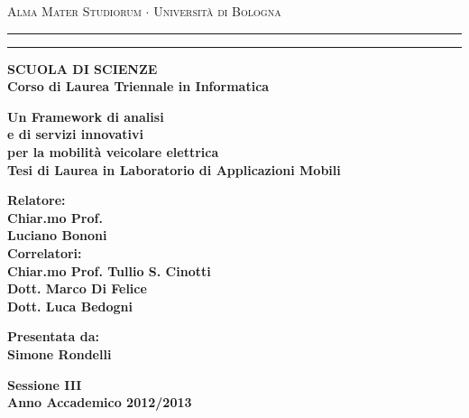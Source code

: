   \begin{titlepage}
    \begin{center}
      {{\Large{\textsc{Alma Mater Studiorum $\cdot$ Universit\`a di Bologna}}}} \rule[0.1cm]{15.8cm}{0.1mm}
      \rule[0.5cm]{15.8cm}{0.6mm}
      {\small{\bf SCUOLA DI SCIENZE\\
      Corso di Laurea Triennale in Informatica }}
    \end{center}
    
    \vspace{15mm}
    
    \begin{center}
      {\LARGE{\bf Un Framework di analisi}}\\
      \vspace{3mm}
      {\LARGE{\bf e di servizi innovativi}}\\
	  \vspace{3mm}
      {\LARGE{\bf per la mobilità veicolare elettrica}}\\
      \vspace{15mm} 
      {\large{\bf Tesi di Laurea in Laboratorio di Applicazioni Mobili}}
    \end{center}
    
    \vspace{25mm}
    \par
    \noindent
    
    \begin{minipage}[t]{0.60\textwidth}
      {\large{\bf Relatore:\\
      Chiar.mo Prof.\\
      Luciano Bononi\newline}}\\
	{\large{\bf Correlatori:\\
	Chiar.mo Prof. Tullio S. Cinotti\\
	Dott. Marco Di Felice\\
	Dott. Luca Bedogni}}
    \end{minipage}
      \hfill
    \begin{minipage}[t]{0.34\textwidth}\raggedleft
    {\large{\bf Presentata da:\\
    Simone Rondelli}}  
    \end{minipage}
   \vspace{13mm}
    \begin{center}
	{\large{\bf Sessione III\\
	Anno Accademico 2012/2013}}
	\end{center}
	\clearpage{\pagestyle{empty}\cleardoublepage}%
  \end{titlepage}
  
\begin{abstract}
    Abstract \LaTeX.
    
    Abbiamo la testa rotonda 
	per pensare in tutte le direzioni. 
 
	Francis Picabia - (1922) 
\end{abstract}